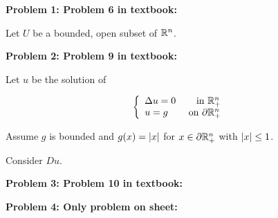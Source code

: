 \documentclass[a4paper,12pt]{article}
\begin{document}
{\bf Problem 1: Problem 6 in textbook:}

Let $U$ be a bounded, open subset of $\mathbb{R}^n$. 


\shunt

{\bf Problem 2: Problem 9 in textbook:}

Let $u$ be the solution of 

\begin{displaymath}
   \left\{
     \begin{array}{lr}
       \Delta u = 0 & \text{ in } \mathbb{R}_+^n\\
       u=g & \text{ on }\partial \mathbb{R}_+^n
     \end{array}
   \right.
\end{displaymath}

Assume $g$ is bounded and $g(x) = \left\lvert x \right\rvert$ for $x \in \partial \mathbb{R}_+^n$ with $\left\lvert x \right\rvert\leq 1$.

Consider $Du$.


\shunt

{\bf Problem 3: Problem 10 in textbook:}

\shunt

{\bf Problem 4: Only problem on sheet:}

\shunt
\end{document}
